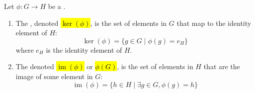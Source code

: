 \begin{definition} \label{definition:kernel_image_of_group_homomorphism}
Let $\phi: G \to H$ be a .
\begin{enumerate}
    \item The , denoted \hl{$\operatorname{ker}(\phi)$}, is the set of elements in $G$ that map to the identity element of $H$:
    $$ \operatorname{ker}(\phi) = \{ g \in G \mid \phi(g) = e_H \} $$
    where $e_H$ is the identity element of $H$. 

    \item The  denoted \hl{$\operatorname{im}(\phi)$} or \hl{$\phi(G)$}, is the set of elements in $H$ that are the image of some element in $G$:
    $$ \operatorname{im}(\phi) = \{ h \in H \mid \exists g \in G, \phi(g) = h \} $$
\end{enumerate}
\end{definition}